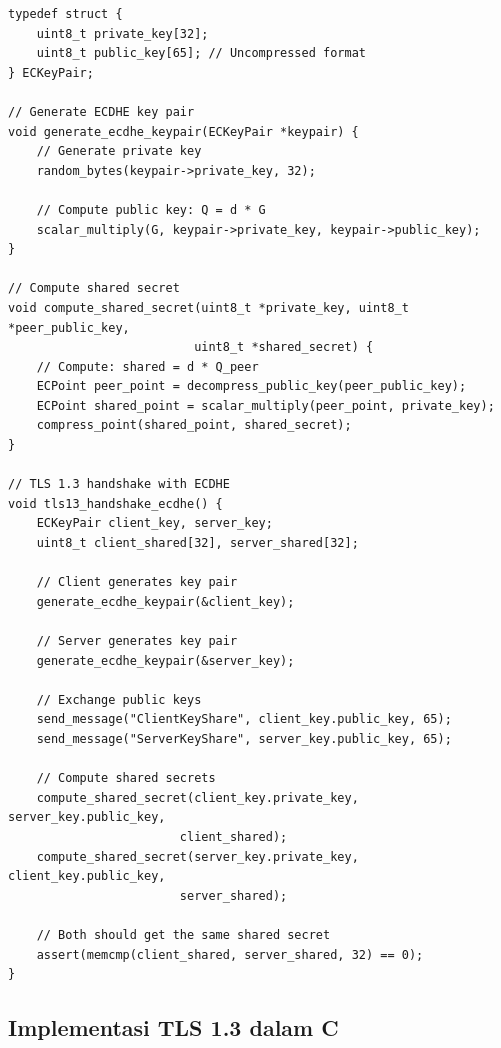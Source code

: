 \begin{lstlisting}[style=cstyle, caption={ECDHE Key Exchange dalam TLS 1.3}]
typedef struct {
    uint8_t private_key[32];
    uint8_t public_key[65]; // Uncompressed format
} ECKeyPair;

// Generate ECDHE key pair
void generate_ecdhe_keypair(ECKeyPair *keypair) {
    // Generate private key
    random_bytes(keypair->private_key, 32);
    
    // Compute public key: Q = d * G
    scalar_multiply(G, keypair->private_key, keypair->public_key);
}

// Compute shared secret
void compute_shared_secret(uint8_t *private_key, uint8_t *peer_public_key, 
                          uint8_t *shared_secret) {
    // Compute: shared = d * Q_peer
    ECPoint peer_point = decompress_public_key(peer_public_key);
    ECPoint shared_point = scalar_multiply(peer_point, private_key);
    compress_point(shared_point, shared_secret);
}

// TLS 1.3 handshake with ECDHE
void tls13_handshake_ecdhe() {
    ECKeyPair client_key, server_key;
    uint8_t client_shared[32], server_shared[32];
    
    // Client generates key pair
    generate_ecdhe_keypair(&client_key);
    
    // Server generates key pair
    generate_ecdhe_keypair(&server_key);
    
    // Exchange public keys
    send_message("ClientKeyShare", client_key.public_key, 65);
    send_message("ServerKeyShare", server_key.public_key, 65);
    
    // Compute shared secrets
    compute_shared_secret(client_key.private_key, server_key.public_key, 
                        client_shared);
    compute_shared_secret(server_key.private_key, client_key.public_key, 
                        server_shared);
    
    // Both should get the same shared secret
    assert(memcmp(client_shared, server_shared, 32) == 0);
}
\end{lstlisting}

\subsection{Implementasi TLS 1.3 dalam C}

